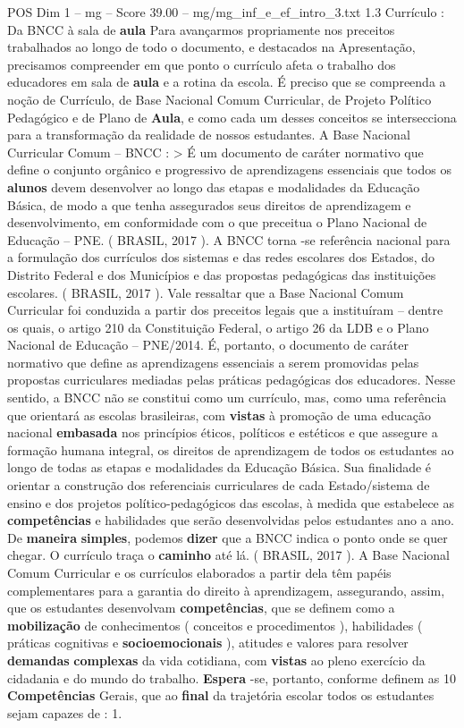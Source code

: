\begin{textsample}{POS Dim 1 – mg – Score 39.00 – mg/mg\_inf\_e\_ef\_intro\_3.txt}  \label{ex:f1_pos_237}
1.3 Currículo : Da BNCC à sala de \textbf{aula} Para avançarmos propriamente nos preceitos trabalhados ao longo de todo o documento, e destacados na Apresentação, precisamos compreender em que ponto o currículo afeta o trabalho dos educadores em sala de \textbf{aula} e a rotina da escola.
É preciso que se compreenda a noção de Currículo, de Base Nacional Comum Curricular, de Projeto Político Pedagógico e de Plano de \textbf{Aula}, e como cada um desses conceitos se intersecciona para a transformação da realidade de nossos estudantes.
A Base Nacional Curricular Comum – BNCC : > É um documento de caráter normativo que define o conjunto orgânico e progressivo de aprendizagens essenciais que todos os \textbf{alunos} devem desenvolver ao longo das etapas e modalidades da Educação Básica, de modo a que tenha assegurados seus direitos de aprendizagem e desenvolvimento, em conformidade com o que preceitua o Plano Nacional de Educação – PNE. ( BRASIL, 2017 ).
A BNCC torna -se referência nacional para a formulação dos currículos dos sistemas e das redes escolares dos Estados, do Distrito Federal e dos Municípios e das propostas pedagógicas das instituições escolares. ( BRASIL, 2017 ).
Vale ressaltar que a Base Nacional Comum Curricular foi conduzida a partir dos preceitos legais que a instituíram – dentre os quais, o artigo 210 da Constituição Federal, o artigo 26 da LDB e o Plano Nacional de Educação – PNE/2014.
É, portanto, o documento de caráter normativo que define as aprendizagens essenciais a serem promovidas pelas propostas curriculares mediadas pelas práticas pedagógicas dos educadores.
Nesse sentido, a BNCC não se constitui como um currículo, mas, como uma referência que orientará as escolas brasileiras, com \textbf{vistas} à promoção de uma educação nacional \textbf{embasada} nos princípios éticos, políticos e estéticos e que assegure a formação humana integral, os direitos de aprendizagem de todos os estudantes ao longo de todas as etapas e modalidades da Educação Básica.
Sua finalidade é orientar a construção dos referenciais curriculares de cada Estado/sistema de ensino e dos projetos político-pedagógicos das escolas, à medida que estabelece as \textbf{competências} e habilidades que serão desenvolvidas pelos estudantes ano a ano.
De \textbf{maneira} \textbf{simples}, podemos \textbf{dizer} que a BNCC indica o ponto onde se quer chegar.
O currículo traça o \textbf{caminho} até lá. ( BRASIL, 2017 ).
A Base Nacional Comum Curricular e os currículos elaborados a partir dela têm papéis complementares para a garantia do direito à aprendizagem, assegurando, assim, que os estudantes desenvolvam \textbf{competências}, que se definem como a \textbf{mobilização} de conhecimentos ( conceitos e procedimentos ), habilidades ( práticas cognitivas e \textbf{socioemocionais} ), atitudes e valores para resolver \textbf{demandas} \textbf{complexas} da vida cotidiana, com \textbf{vistas} ao pleno exercício da cidadania e do mundo do trabalho. \textbf{Espera} -se, portanto, conforme definem as 10 \textbf{Competências} Gerais, que ao \textbf{final} da trajetória escolar todos os estudantes sejam capazes de : 1.

\end{textsample}

